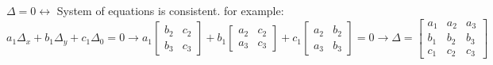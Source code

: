 \documentclass[12pt]{article}
\begin{document}
\begin{flushleft}
	\textbullet \quad $\Delta = 0 \leftrightarrow $ System of equations is consistent. \linebreak 
	for example: $\displaystyle a_1 \Delta_x + b_1 \Delta_y + c_1 \Delta_0 = 0 \rightarrow a_1 
	\begin{bmatrix}
	b_2 & c_2 \\ 
	b_3 & c_3
	\end{bmatrix} + b_1 
	\begin{bmatrix}
	a_2 & c_2 \\ 
	a_3 & c_3
	\end{bmatrix} + c_1 
	\begin{bmatrix}
	a_2 & b_2 \\ 
	a_3 & b_3
	\end{bmatrix} = 0 \rightarrow \Delta = 
	\begin{bmatrix}
	a_1 & a_2 & a_3 \\ 
	b_1 & b_2 & b_3 \\ 
	c_1 & c_2 & c_3
	\end{bmatrix} $ \linebreak 
	

\end{flushleft}
\end{document}
